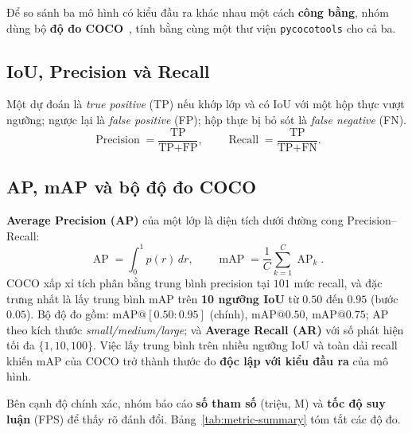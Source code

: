 \documentclass[12pt]{article}
\numberwithin{equation}{section}
\begin{document}
Để so sánh ba mô hình có kiểu đầu ra khác nhau một cách \textbf{công bằng}, nhóm dùng bộ
\textbf{độ đo COCO}~\cite{coco}, tính bằng cùng một thư viện \texttt{pycocotools} cho cả ba.

\subsection{IoU, Precision và Recall}

Một dự đoán là \textit{true positive} (TP) nếu khớp lớp và có IoU với một hộp thực vượt ngưỡng;
ngược lại là \textit{false positive} (FP); hộp thực bị bỏ sót là \textit{false negative} (FN).
\begin{equation}
\operatorname{Precision} = \frac{\text{TP}}{\text{TP}+\text{FP}}, \qquad
\operatorname{Recall} = \frac{\text{TP}}{\text{TP}+\text{FN}}.
\label{eq:precision-recall}
\end{equation}

\subsection{AP, mAP và bộ độ đo COCO}

\textbf{Average Precision (AP)} của một lớp là diện tích dưới đường cong Precision--Recall:
\begin{equation}
\operatorname{AP} = \int_0^1 p(r)\, dr,
\qquad
\operatorname{mAP} = \frac{1}{C}\sum_{k=1}^{C}\operatorname{AP}_k.
\label{eq:ap}
\end{equation}
COCO xấp xỉ tích phân bằng trung bình precision tại $101$ mức recall, và đặc trưng nhất là lấy
trung bình mAP trên \textbf{10 ngưỡng IoU} từ $0.50$ đến $0.95$ (bước $0.05$). Bộ độ đo gồm:
$\text{mAP}@[0.50{:}0.95]$ (chính), $\text{mAP}@0.50$, $\text{mAP}@0.75$; AP theo kích thước
\textit{small/medium/large}; và \textbf{Average Recall (AR)} với số phát hiện tối đa
$\{1,10,100\}$. Việc lấy trung bình trên nhiều ngưỡng IoU và toàn dải recall khiến mAP của
COCO trở thành thước đo \textbf{độc lập với kiểu đầu ra} của mô hình.

Bên cạnh độ chính xác, nhóm báo cáo \textbf{số tham số} (triệu, M) và \textbf{tốc độ suy luận}
(FPS) để thấy rõ đánh đổi. Bảng~\ref{tab:metric-summary} tóm tắt các độ đo.
\end{document}
